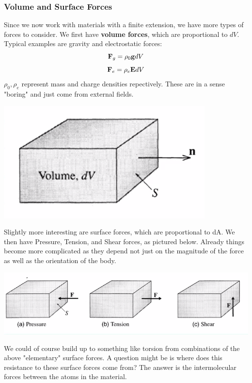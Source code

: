 \subsubsection{Volume and Surface Forces}
Since we now work with materials with a finite extension, we have more types of forces to consider. We first have \textbf{volume forces}, which are proportional to $dV$. Typical examples are gravity and electrostatic forces:
\[\mathbf{F}_g = \rho_0 \mathbf{g}dV\]
\[\mathbf{F}_e = \rho_e \mathbf{E}dV\]
$\rho_0, \rho_e$ represent mass and charge densities repectively. These are in a sense "boring" and just come from external fields.
\begin{center}
    \includegraphics[scale=0.9]{Lecture-30/l30-img4.png}
\end{center}
Slightly more interesting are surface forces, which are proportional to dA. We then have Pressure, Tension, and Shear forces, as pictured below. Already things become more complicated as they depend not just on the magnitude of the force as well as the orientation of the body. 
\begin{center}
    \includegraphics[scale=0.9]{Lecture-30/l30-img5.png}
\end{center}
We could of course build up to something like torsion from combinations of the above "elementary" surface forces.
\newline A question might be is where does this resistance to these surface forces come from? The answer is the intermolecular forces between the atoms in the material. 

